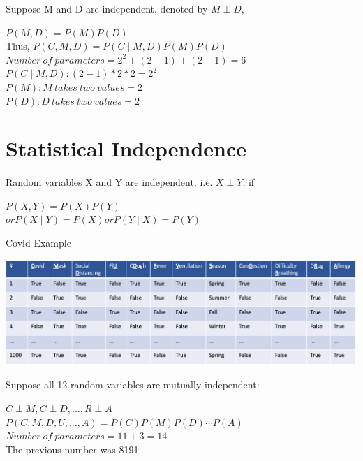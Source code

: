 \documentclass[11pt,a4paper]{report}
\begin{document}
Suppose M and D are independent, denoted by $M \perp D$,

\begin{center}
    $P(M, D) = P(M)P(D)$ \\
    Thus,
    $P(C, M, D) = P(C \mid M, D)P(M)P(D)$\\
    \vspace{0.5cm}
    $Number\ of\ parameters = 2^2 + (2 - 1) + (2 - 1) = 6$\\
    $P(C \mid M, D): (2-1) * 2 * 2 = 2^2$\\
    $P(M): M\ takes\ two\ values = 2$\\
    $P(D): D\ takes\ two\ values = 2$\\
    
\end{center}


\section{Statistical Independence}

Random variables X and Y are independent, i.e. $X \perp Y$, if
\begin{center}
    $P(X, Y) = P(X)P(Y)$ \\
    $or P(X \mid Y) = P(X) or P(Y \mid X) = P(Y) $
\end{center}

Covid Example

\begin{center}
    \includegraphics[width=15cm, height=4cm]{covid_12var.png}
\end{center}

Suppose all 12 random variables are mutually independent:

\begin{center}
    $C \perp M, C \perp D, \ldots, R \perp A$\\
    $P(C, M, D, U, \ldots, A) = P(C)P(M)P(D) \cdots P(A)$\\
    \vspace{0.5cm}
    $Number\ of\ parameters = 11 + 3 = 14$\\
    The previous number was 8191.
\end{center}
\end{document}
